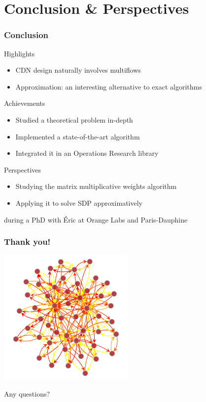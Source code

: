 \documentclass{beamer}
\begin{document}
\section{Conclusion \& Perspectives}
\begin{frame}
    \frametitle{Conclusion}

    \begin{block}{Highlights}
        \begin{itemize}
            \item CDN design naturally involves multiflows
            \item Approximation: an interesting alternative to exact algorithms
        \end{itemize}
    \end{block}

    \begin{block}{Achievements}
        \begin{itemize}
            \item Studied a theoretical problem in-depth
            \item Implemented a state-of-the-art algorithm
            \item Integrated it in an Operations Research library
        \end{itemize}
    \end{block}

    \begin{block}{Perspectives}
        \begin{itemize}
            \item Studying the matrix multiplicative weights algorithm
            \item Applying it to solve SDP approximatively
        \end{itemize}
        during a PhD with \'Eric at Orange Labs and Paris-Dauphine
    \end{block}
\end{frame}

\begin{frame}
    \frametitle{Thank you!}

    \begin{center}
        \includegraphics[width=0.5\textwidth]{approx_multiflow.png}

        Any questions?
    \end{center}
\end{frame}
\end{document}
